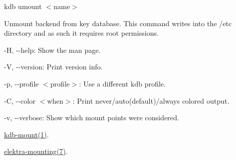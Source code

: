 {\ttfamily kdb umount $<$name$>$}

Unmount backend from key database. This command writes into the {\ttfamily /etc} directory and as such it requires root permissions.


\begin{DoxyItemize}
\item {\ttfamily -\/H}, {\ttfamily -\/-\/help}\+: Show the man page.
\item {\ttfamily -\/V}, {\ttfamily -\/-\/version}\+: Print version info.
\item {\ttfamily -\/p}, {\ttfamily -\/-\/profile $<$profile$>$}\+: Use a different kdb profile.
\item {\ttfamily -\/C}, {\ttfamily -\/-\/color $<$when$>$}\+: Print never/auto(default)/always colored output.
\item {\ttfamily -\/v}, {\ttfamily -\/-\/verbose}\+: Show which mount points were considered.
\end{DoxyItemize}


\begin{DoxyItemize}
\item \hyperlink{doc_help_kdb-mount_md}{kdb-\/mount(1)}.
\item \hyperlink{doc_help_elektra-mounting_md}{elektra-\/mounting(7)}. 
\end{DoxyItemize}